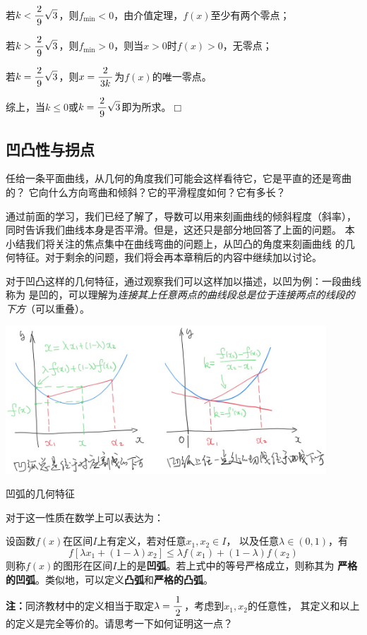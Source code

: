 若$k<\displaystyle\frac{\,{2}\,}{\,{9}\,}\sqrt3$，则$f_{\min}<0$，由介值定理，$f(x)$至少有两个零点；

若$k>\displaystyle\frac{\,{2}\,}{\,{9}\,}\sqrt3$，则$f_{\min}>0$，则当$x>0$时$f(x)>0$，无零点；

若$k=\displaystyle\frac{\,{2}\,}{\,{9}\,}\sqrt3$，则$x=\displaystyle\frac{\,{2}\,}{\,{3k}\,}$为$f(x)$的唯一零点。

综上，当$k\leq 0$或$k=\displaystyle\frac{\,{2}\,}{\,{9}\,}\sqrt3$即为所求。\hfill$\Box$

\subsection{凹凸性与拐点}

任给一条平面曲线，从几何的角度我们可能会这样看待它，它是平直的还是弯曲的？
它向什么方向弯曲和倾斜？它的平滑程度如何？它有多长？

通过前面的学习，我们已经了解了，导数可以用来刻画曲线的倾斜程度（斜率），
同时告诉我们曲线本身是否平滑。但是，这还只是部分地回答了上面的问题。
本小结我们将关注的焦点集中在曲线弯曲的问题上，从凹凸的角度来刻画曲线
的几何特征。对于剩余的问题，我们将会再本章稍后的内容中继续加以讨论。


对于凹凸这样的几何特征，通过观察我们可以这样加以描述，以凹为例：一段曲线称为
是凹的，可以理解为{\it 连接其上任意两点的曲线段总是位于连接两点的线段的下方}（可以重叠）。

\begin{center}
 	\includegraphics[width=0.9\textwidth]{./images/ch3/convexCurve.jpg}

	\kaishu 凹弧的几何特征
\end{center}

对于这一性质在数学上可以表达为：

\begin{thx}
	设函数$f(x)$在区间$I$上有定义，若对任意$x_1,x_2\in I$，
	以及任意$\lambda\in(0,1)$，有
	$$f[\lambda x_1+(1-\lambda)x_2]\leq\lambda f(x_1)+(1-\lambda)f(x_2)$$
	则称$f(x)$的图形在区间$I$上的是{\bf 凹弧}。若上式中的等号严格成立，则称其为
	{\bf 严格的凹弧}。类似地，可以定义{\bf 凸弧}和{\bf 严格的凸弧}。
\end{thx}
{\bf 注：}同济教材中的定义相当于取定$\lambda=\displaystyle\frac{\,{1}\,}{\,{2}\,}$，考虑到$x_1,x_2$的任意性，
其定义和以上的定义是完全等价的。请思考一下如何证明这一点？

